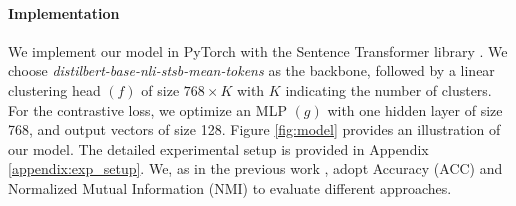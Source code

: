 \documentclass[11pt]{article}
\begin{document}
\paragraph{Implementation}
We implement our model in PyTorch \citep{paszke2017automatic} with the Sentence Transformer library  \citep{reimers-2019-sentence-bert}.  We choose \textit{distilbert-base-nli-stsb-mean-tokens} as the backbone, followed by a linear clustering head $(f)$ of size $768\times K$ with $K$ indicating the number of clusters. For the contrastive loss, we optimize an MLP $(g)$ with one hidden layer of size 768, and output vectors of size 128. Figure \ref{fig:model} provides an illustration of our model. The detailed experimental setup is provided in Appendix \ref{appendix:exp_setup}. We, as in the previous work \citet{xu2017self, hadifar2019self,rakib2020enhancement}, adopt Accuracy (ACC)  and Normalized Mutual Information (NMI) to evaluate different approaches.  
\end{document}
